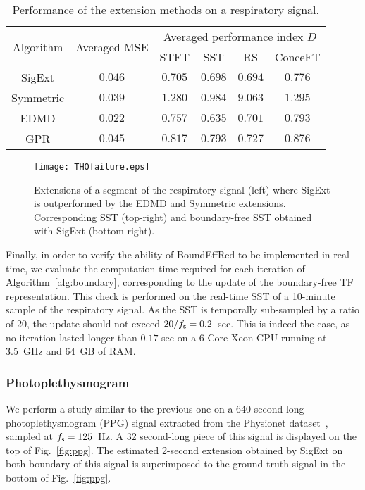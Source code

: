 \begin{table}
\centering
\caption{Performance of the extension methods on a respiratory signal.}
\begin{tabular}{|c||c||c|c|c|c|}
  \hline
   \multirow{2}{*}{Algorithm} & \multirow{2}{35pt}{\centering Averaged MSE} & \multicolumn{4}{c|}{Averaged performance index $D$} \\
   \cline{3-6}
      & & STFT & SST & RS & ConceFT \\
   \hhline{|=#=#=|=|=|=|}
   {\sf SigExt} & $0.046$ & $0.705$ & $0.698$ & $0.694$ & $0.776$ \\
   \hline
   Symmetric & $0.039$ & $1.280$ & $0.984$ & $9.063$ & $1.295$ \\
   \hline
   EDMD & $0.022$ & $0.757$ & $0.635$ & $0.701$ & $0.793$ \\
   \hline
   GPR & $0.045$ & $0.817$ & $0.793$ & $0.727$ & $0.876$ \\ 
   \hline
\end{tabular}
\label{tab:THO}
\end{table}

\begin{figure}
\centering
\texttt{[image: THOfailure.eps]}
\caption{Extensions of a segment of the respiratory signal (left) where {\sf SigExt} is outperformed by the EDMD and Symmetric extensions. Corresponding SST (top-right) and boundary-free SST obtained with {\sf SigExt} (bottom-right).}
\label{fig:THO.failure}
\end{figure} 

Finally, in order to verify the ability of {\sf BoundEffRed} to be implemented in real time, we evaluate the computation time required for each iteration of Algorithm~\ref{alg:boundary}, corresponding to the update of the boundary-free TF representation. This check is performed on the real-time SST of a 10-minute sample of the respiratory signal. As the SST is temporally sub-sampled by a ratio of 20, the update should not exceed $20/f_{\mathsf s}=0.2$~sec. This is indeed the case, as no iteration lasted longer than $0.17$ sec on a 6-Core Xeon CPU running at 3.5~GHz and 64~GB of RAM.


\subsubsection{Photoplethysmogram}
\label{ssse:ppg}
We perform a study similar to the previous one on a 640 second-long photoplethysmogram (PPG) signal extracted from the Physionet dataset~\cite{Pimentel17toward, Goldberger00physiobank}, sampled at $f_{\mathsf s}=125$~Hz. A 32 second-long piece of this signal is displayed on the top of Fig.~\ref{fig:ppg}. The estimated 2-second extension obtained by {\sf SigExt} on both boundary of this signal is superimposed to the ground-truth signal in the bottom of Fig.~\ref{fig:ppg}.

